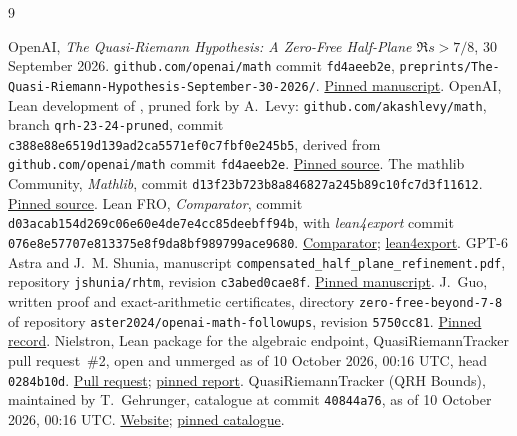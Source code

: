 \documentclass[11pt]{article}
\begin{document}
\begin{thebibliography}{9}
\raggedright
{} OpenAI, \emph{The Quasi-Riemann Hypothesis:
A Zero-Free Half-Plane $\Re s>7/8$}, 30 September 2026.
\nolinkurl{github.com/openai/math} commit \nolinkurl{fd4aeeb2e},
\nolinkurl{preprints/The-Quasi-Riemann-Hypothesis-September-30-2026/}.
\href{https://github.com/openai/math/blob/fd4aeeb2ee4fc729c18d98444fed42fd0529eeeb/preprints/The-Quasi-Riemann-Hypothesis-September-30-2026/paper.pdf}{Pinned manuscript}.
 OpenAI, Lean development of \cite{openai}, pruned fork by
A.~Levy: \nolinkurl{github.com/akashlevy/math}, branch
\nolinkurl{qrh-23-24-pruned}, commit
\nolinkurl{c388e88e6519d139ad2ca5571ef0c7fbf0e245b5}, derived from
\nolinkurl{github.com/openai/math} commit \nolinkurl{fd4aeeb2e}.
\href{https://github.com/akashlevy/math/tree/c388e88e6519d139ad2ca5571ef0c7fbf0e245b5}{Pinned source}.
 The mathlib Community, \emph{Mathlib}, commit
\nolinkurl{d13f23b723b8a846827a245b89c10fc7d3f11612}.
\href{https://github.com/leanprover-community/mathlib4/tree/d13f23b723b8a846827a245b89c10fc7d3f11612}{Pinned source}.
 Lean FRO, \emph{Comparator}, commit
\nolinkurl{d03acab154d269c06e60e4de7e4cc85deebff94b}, with
\emph{lean4export} commit
\nolinkurl{076e8e57707e813375e8f9da8bf989799ace9680}.
\href{https://github.com/leanprover/comparator/tree/d03acab154d269c06e60e4de7e4cc85deebff94b}{Comparator};
\href{https://github.com/leanprover/lean4export/tree/076e8e57707e813375e8f9da8bf989799ace9680}{lean4export}.
 GPT-6 Astra and J.~M. Shunia, manuscript
\nolinkurl{compensated_half_plane_refinement.pdf}, repository
\nolinkurl{jshunia/rhtm}, revision \nolinkurl{c3abed0cae8f}.
\href{https://github.com/jshunia/rhtm/blob/c3abed0cae8fdb0090c12b0e4d20aea68b6e067d/compensated_half_plane_refinement.pdf}{Pinned manuscript}.
 J.~Guo, written proof and exact-arithmetic certificates,
directory \nolinkurl{zero-free-beyond-7-8} of repository
\nolinkurl{aster2024/openai-math-followups}, revision
\nolinkurl{5750cc81}.
\href{https://github.com/aster2024/openai-math-followups/blob/5750cc81e489729a2111d6c9c073f4adecdb9de7/zero-free-beyond-7-8/README.md}{Pinned record}.
 Nielstron, Lean package for the algebraic endpoint,
QuasiRiemannTracker pull request~\#2, open and unmerged as of
10 October 2026, 00:16 UTC, head \nolinkurl{0284b10d}.
\href{https://github.com/GTimG/QuasiRiemannTracker/pull/2}{Pull request};
\href{https://github.com/nielstron/QuasiRiemannTracker/blob/0284b10d3c8c92b4d8995c36f24728be03815b4a/public/proofs/nielstron-algebraic-20261009-kernels/result.json}{pinned report}.
 QuasiRiemannTracker (QRH Bounds), maintained by
T.~Gehrunger, catalogue at commit \nolinkurl{40844a76}, as of
10 October 2026, 00:16 UTC.
\href{https://gtimg.github.io/QuasiRiemannTracker/}{Website};
\href{https://github.com/GTimG/QuasiRiemannTracker/blob/40844a7614b67840801e65b836b3da2e1f7ff029/catalogue/results.json}{pinned catalogue}.
\end{thebibliography}
\end{document}
